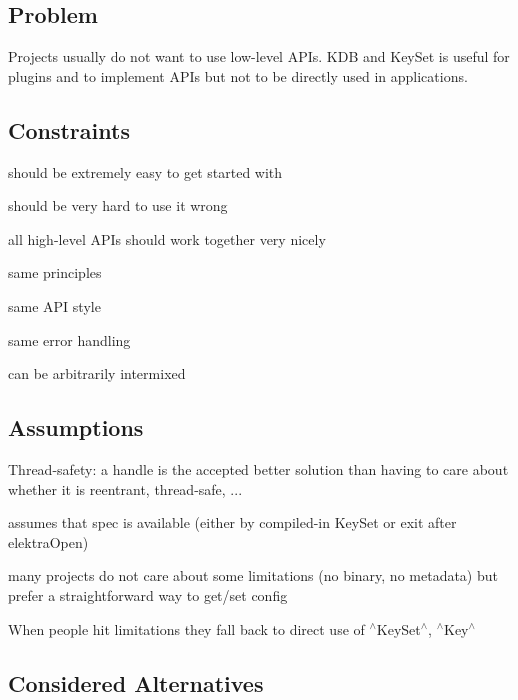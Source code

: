 \subsection*{Problem}

Projects usually do not want to use low-\/level A\+P\+Is. {\ttfamily K\+DB} and {\ttfamily Key\+Set} is useful for plugins and to implement A\+P\+Is but not to be directly used in applications.

\subsection*{Constraints}


\begin{DoxyEnumerate}
\item should be extremely easy to get started with
\item should be very hard to use it wrong
\item all high-\/level A\+P\+Is should work together very nicely
\begin{DoxyItemize}
\item same principles
\item same A\+PI style
\item same error handling
\item can be arbitrarily intermixed
\end{DoxyItemize}
\end{DoxyEnumerate}

\subsection*{Assumptions}


\begin{DoxyItemize}
\item Thread-\/safety\+: a handle is the accepted better solution than having to care about whether it is reentrant, thread-\/safe, ...
\item assumes that spec is available (either by compiled-\/in {\ttfamily Key\+Set} or exit after elektra\+Open)
\item many projects do not care about some limitations (no binary, no metadata) but prefer a straightforward way to get/set config
\item When people hit limitations they fall back to direct use of $^\wedge$\+Key\+Set$^\wedge$, $^\wedge$\+Key$^\wedge$
\end{DoxyItemize}

\subsection*{Considered Alternatives}


